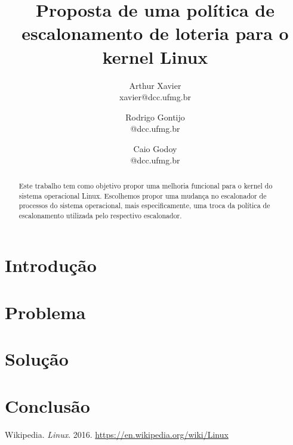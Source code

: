 \documentclass[a4paper,12pt]{article}
\title{Proposta de uma política de escalonamento de loteria para o kernel Linux}
\author{
    Arthur Xavier\\
    \small{xavier@dcc.ufmg.br}
    \and
    Rodrigo Gontijo\\
    \small{@dcc.ufmg.br}
    \and
    Caio Godoy\\
    \small{@dcc.ufmg.br}
}
\begin{document}
\maketitle

\begin{abstract}
  Este trabalho tem como objetivo propor uma melhoria funcional para o kernel do sistema operacional Linux. Escolhemos propor uma mudança no escalonador de processos do sistema operacional, mais especificamente, uma troca da política de escalonamento utilizada pelo respectivo escalonador.
\end{abstract}

\section{Introdução}

\section{Problema}

\section{Solução}

\section{Conclusão}

\begin{thebibliography}{99}
 Wikipedia. \emph{Linux}. 2016. \url{https://en.wikipedia.org/wiki/Linux}
\end{thebibliography}
\end{document}
